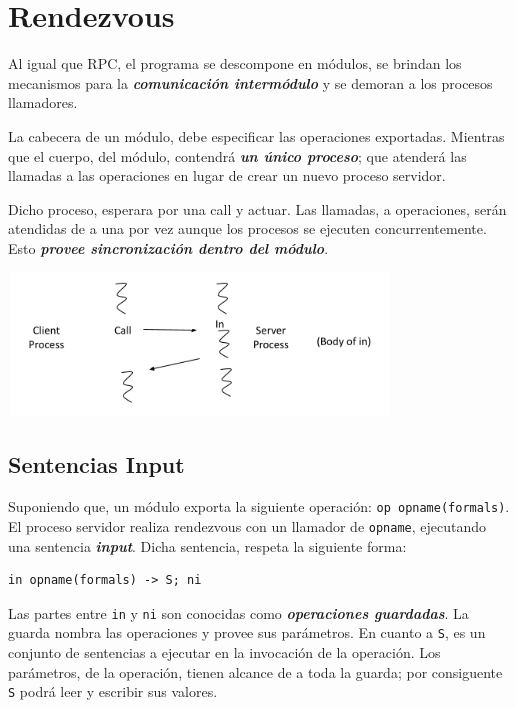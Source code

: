 \documentclass[a4paper, 10pt]{report}
\begin{document}
\section{Rendezvous}

Al igual que RPC, el programa se descompone en módulos, se brindan los mecanismos para la \textbf{\emph{comunicación intermódulo}} y se demoran a los procesos llamadores.

La cabecera de un módulo, debe especificar las operaciones exportadas. Mientras que el cuerpo, del módulo, contendrá \textbf{\emph{un único proceso}}; que atenderá las llamadas a las operaciones en lugar de crear un nuevo proceso servidor.

Dicho proceso, esperara por una call y actuar. Las llamadas, a operaciones, serán atendidas de a una por vez aunque los procesos se ejecuten concurrentemente. Esto \textbf{\emph{provee sincronización dentro del módulo}}.

\centerline{
    \includegraphics[width=4in, height=1.5in]{assets/rendezvous_execution.png}
}

\subsection{Sentencias Input}

Suponiendo que, un módulo exporta la siguiente operación: \lstinline{op opname(formals)}. El proceso servidor realiza rendezvous con un llamador de \lstinline{opname}, ejecutando una sentencia \textbf{\emph{input}}. Dicha sentencia, respeta la siguiente forma:

\begin{lstlisting}
in opname(formals) -> S; ni
\end{lstlisting}

Las partes entre \lstinline{in} y \lstinline{ni} son conocidas como \textbf{\emph{operaciones guardadas}}. La guarda nombra las operaciones y provee sus parámetros.
En cuanto a \lstinline{S}, es un conjunto de sentencias a ejecutar en la invocación de la operación. Los parámetros, de la operación, tienen alcance de a toda la guarda; por consiguente \lstinline{S} podrá leer y escribir sus valores.
\end{document}
